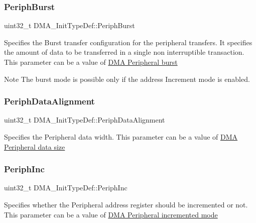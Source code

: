\subsubsection{\texorpdfstring{Periph\+Burst}{PeriphBurst}}
{\footnotesize\ttfamily uint32\+\_\+t D\+M\+A\+\_\+\+Init\+Type\+Def\+::\+Periph\+Burst}

Specifies the Burst transfer configuration for the peripheral transfers. It specifies the amount of data to be transferred in a single non interruptible transaction. This parameter can be a value of \hyperlink{group___d_m_a___peripheral__burst}{D\+MA Peripheral burst} \begin{DoxyNote}{Note}
The burst mode is possible only if the address Increment mode is enabled. 
\end{DoxyNote}
\mbox{\label{struct_d_m_a___init_type_def_a10a4a549953efa20c235dcbb381b6f0b}} 
\subsubsection{\texorpdfstring{Periph\+Data\+Alignment}{PeriphDataAlignment}}
{\footnotesize\ttfamily uint32\+\_\+t D\+M\+A\+\_\+\+Init\+Type\+Def\+::\+Periph\+Data\+Alignment}

Specifies the Peripheral data width. This parameter can be a value of \hyperlink{group___d_m_a___peripheral__data__size}{D\+MA Peripheral data size} \mbox{\label{struct_d_m_a___init_type_def_a46811eb656170cb5c542054d1a41db3a}} 
\subsubsection{\texorpdfstring{Periph\+Inc}{PeriphInc}}
{\footnotesize\ttfamily uint32\+\_\+t D\+M\+A\+\_\+\+Init\+Type\+Def\+::\+Periph\+Inc}

Specifies whether the Peripheral address register should be incremented or not. This parameter can be a value of \hyperlink{group___d_m_a___peripheral__incremented__mode}{D\+MA Peripheral incremented mode} \mbox{\label{struct_d_m_a___init_type_def_af110cc02c840207930e3c0e5de5d7dc4}} 

